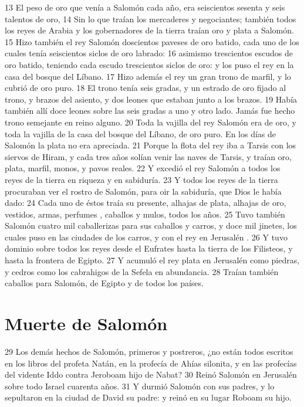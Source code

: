  
13 El peso de oro que venía a Salomón cada año, era seiscientos sesenta y seis talentos de oro,
14 Sin lo que traían los mercaderes y negociantes; también todos los reyes de Arabia y los gobernadores de la tierra traían oro y plata a Salomón.
15 Hizo también el rey Salomón doscientos paveses de oro batido, cada uno de los cuales tenía seiscientos siclos de oro   labrado:
16 asimismo trescientos escudos de oro batido, teniendo cada escudo trescientos siclos de oro:   y los puso el rey en la casa del bosque del Líbano.
17 Hizo además el rey un gran trono de marfil, y lo cubrió de oro puro.
18 El trono tenía seis gradas, y un estrado de oro fijado al trono, y brazos del asiento, y dos leones que estaban junto a los brazos.
19 Había también allí doce leones sobre las seis gradas a uno y otro lado. Jamás fue hecho trono semejante en reino alguno.
20 Toda la vajilla del rey Salomón era de oro, y toda la vajilla de la casa del bosque del Líbano, de oro puro. En los días de Salomón la plata no era apreciada.
21 Porque la flota del rey iba a Tarsis con los siervos de Hiram, y cada tres años solían venir las naves de Tarsis, y traían oro, plata, marfil, monos, y pavos reales.
22 Y excedió el rey Salomón a todos los reyes de la tierra en riqueza y en sabiduría.
23 Y todos los reyes de la tierra procuraban ver el rostro de Salomón, para oir la sabiduría, que Dios le había dado:
24 Cada uno de éstos traía su presente, alhajas de plata, alhajas de oro, vestidos, armas, perfumes , caballos y mulos, todos los años.
25 Tuvo también Salomón cuatro mil caballerizas para sus caballos y carros, y doce mil jinetes, los cuales puso en las ciudades de los carros, y con el rey en Jerusalén .
26 Y tuvo dominio sobre todos los reyes desde el Eufrates hasta la tierra de los Filisteos, y hasta la frontera de Egipto. 
27 Y acumuló el rey plata en Jerusalén  como piedras, y cedros como los cabrahigos de la Sefela en abundancia.
28 Traían también caballos para Salomón, de Egipto y de todos los países.
\section*{Muerte de Salomón}

 
29 Los demás hechos de Salomón, primeros y postreros, ¿no están todos escritos en los libros del profeta Natán, en la profecía de Ahías silonita, y en las profecías del vidente Iddo contra Jeroboam hijo de Nabat?
30 Reinó Salomón en Jerusalén  sobre todo Israel cuarenta años.
31 Y durmió Salomón con sus padres, y lo sepultaron en la ciudad de David su padre: y reinó en su lugar Roboam su hijo.

